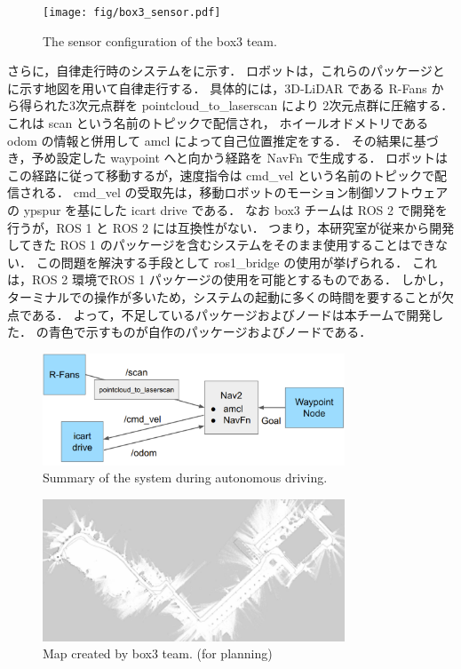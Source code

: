 \documentclass[twocolumn, 9pt]{jsproceedings}
\begin{document}
\begin{figure}[h!]
  \centering
  \texttt{[image: fig/box3\_sensor.pdf]}
  \caption{The sensor configuration of the box3 team.}
  \label{fig:box3-sensor}
\end{figure}


さらに，自律走行時のシステムをに示す．
ロボットは，これらのパッケージとに示す地図を用いて自律走行する．
具体的には，3D-LiDAR である R-Fans から得られた3次元点群を pointcloud\_to\_laserscan により
2次元点群に圧縮する．これは scan という名前のトピックで配信され，
ホイールオドメトリである odom の情報と併用して amcl\cite{amcl} によって自己位置推定をする．
その結果に基づき，予め設定した waypoint へと向かう経路を NavFn\cite{navfn} で生成する．
ロボットはこの経路に従って移動するが，速度指令は cmd\_vel という名前のトピックで配信される．
cmd\_vel の受取先は，移動ロボットのモーション制御ソフトウェアの ypspur\cite{ypspur} を基にした 
icart drive\cite{icart_driver} である．
なお box3 チームは ROS 2 で開発を行うが，ROS 1 と ROS 2 には互換性がない．
つまり，本研究室が従来から開発してきた ROS 1 のパッケージを含むシステムをそのまま使用することはできない．
この問題を解決する手段として ros1\_bridge\cite{bridge} の使用が挙げられる．
これは，ROS 2 環境でROS 1 パッケージの使用を可能とするものである．
しかし，ターミナルでの操作が多いため，システムの起動に多くの時間を要することが欠点である．
よって，不足しているパッケージおよびノードは本チームで開発した． 
の青色で示すものが自作のパッケージおよびノードである．

\begin{figure}[h!]
  \centering
  \includegraphics[width=90mm]{fig/box3_system.pdf}
  \caption{Summary of the system during autonomous driving.}
  \label{fig:box3-system}
\end{figure}

\begin{figure}[H]
  \centering
  \includegraphics[width=90mm]{fig/3-map.pdf}
  \caption{Map created by box3 team. (for planning)}
  \label{fig:3-map}
\end{figure}
\end{document}
